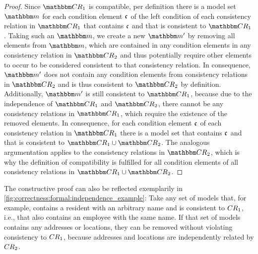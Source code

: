 \begin{proof}
    Since $\consistencyrelationset{CR}_{1}$ is compatible, per definition there is a model set $\modelset{m}$ for each condition element $\mathfrak{c}_{}$ of the left condition of each consistency relation in $\consistencyrelationset{CR}_{1}$ that contains $\mathfrak{c}_{}$ and that is consistent to $\consistencyrelationset{CR}_{1}$.
    Taking such an $\modelset{m}$, we create a new $\modelset{m'}$ by removing all elements from $\modelset{m}$, which are contained in any condition elements in any consistency relation in $\consistencyrelationset{CR}_{2}$ and thus potentially require other elements to occur to be considered consistent to that consistency relation.
    In consequence, $\modelset{m'}$ does not contain any condition elements from consistency relations in $\consistencyrelationset{CR}_{2}$ and is thus consistent to $\consistencyrelationset{CR}_{2}$ by definition. 
    Additionally, $\modelset{m'}$ is still consistent to $\consistencyrelationset{CR}_{1}$, because due to the independence of $\consistencyrelationset{CR}_{1}$ and $\consistencyrelationset{CR}_{2}$, there cannot be any consistency relations in $\consistencyrelationset{CR}_{1}$, which require the existence of the removed elements.
    In consequence, for each condition element $\mathfrak{c}_{}$ of each consistency relation in $\consistencyrelationset{CR}_{1}$ there is a model set that contains $\mathfrak{c}_{}$ and that is consistent to $\consistencyrelationset{CR}_{1} \cup \consistencyrelationset{CR}_{2}$.
    The analogous argumentation applies to the consistency relations in $\consistencyrelationset{CR}_{2}$, which is why the definition of compatibility is fulfilled for all condition elements of all consistency relations in $\consistencyrelationset{CR}_{1} \cup \consistencyrelationset{CR}_{2}$.
\end{proof}

The constructive proof can also be reflected exemplarily in \autoref{fig:correctness:formal:independence_example}: Take any set of models that, for example, contains a resident with an arbitrary name and is consistent to $CR_{1}$, i.e., that also contains an employee with the same name.
If that set of models contains any addresses or locations, they can be removed %
without violating consistency to $CR_{1}$, because addresses and locations are independently related by $CR_{2}$.


